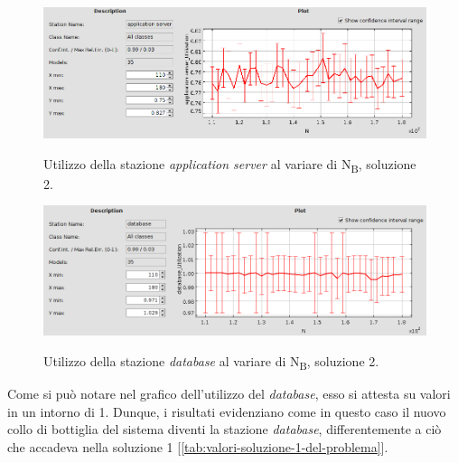 \documentclass[../main.tex]{subfiles}
\begin{document}
    \begin{figure}[H]
        \centering
        \includegraphics[scale = 0.5]{assets/utilization_2_as.png}\\
        \caption[\textit{Utilizzo} della stazione \textit{application server}, soluzione 2]{Utilizzo della stazione
        \textit{application server} al variare di N\textsubscript{B}, soluzione 2.}
        \label{fig:utilizzo-2-as}
    \end{figure}

    \begin{figure}[H]
        \centering
        \includegraphics[scale = 0.5]{assets/utilization_2_db.png}\\
        \caption[\textit{Utilizzo} della stazione \textit{database}, soluzione 2]{Utilizzo della stazione
        \textit{database} al variare di N\textsubscript{B}, soluzione 2.}
        \label{fig:utilizzo-2-db}
    \end{figure}

    Come si può notare nel grafico dell'utilizzo del \textit{database}, esso si attesta su valori in un intorno di 1.
    Dunque, i risultati evidenziano come in questo caso il nuovo collo di bottiglia del sistema diventi la stazione
    \textit{database}, differentemente a ciò che accadeva nella soluzione 1 [\ref{tab:valori-soluzione-1-del-problema}].
\end{document}

